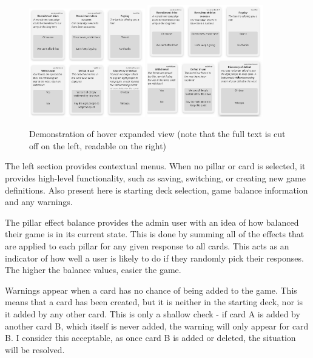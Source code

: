 \begin{figure}[!h]
	\centering
	\includegraphics[width=0.45\textwidth]{./images/design/cards_not_expanded.png}
	\includegraphics[width=0.45\textwidth]{./images/design/cards_expanded.png}
	\caption{Demonstration of hover expanded view (note that the full text is cut off on the left, readable on the right)}
	\label{fig:expand}
\end{figure}

The left section provides contextual menus. When no pillar or card is selected, it provides high-level functionality, such as saving, switching, or creating new game definitions. Also present here is starting deck selection, game balance information and any warnings.

The pillar effect balance provides the admin user with an idea of how balanced their game is in its current state. This is done by summing all of the effects that are applied to each pillar for any given response to all cards. This acts as an indicator of how well a user is likely to do if they randomly pick their responses. The higher the balance values, easier the game.

Warnings appear when a card has no chance of being added to the game. This means that a card has been created, but it is neither in the starting deck, nor is it added by any other card. This is only a shallow check - if card A is added by another card B, which itself is never added, the warning will only appear for card B. I consider this acceptable, as once card B is added or deleted, the situation will be resolved.

